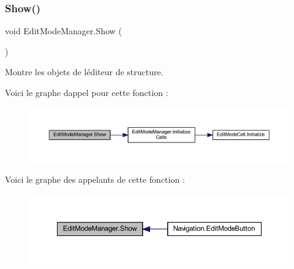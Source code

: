 \subsubsection{\texorpdfstring{Show()}{Show()}}
{\footnotesize\ttfamily void Edit\+Mode\+Manager.\+Show (\begin{DoxyParamCaption}{ }\end{DoxyParamCaption})\hspace{0.3cm}{\ttfamily [inline]}}



Montre les objets de l\textquotesingle{}éditeur de structure. 

Voici le graphe d\textquotesingle{}appel pour cette fonction \+:
\nopagebreak
\begin{figure}[H]
\begin{center}
\leavevmode
\includegraphics[width=350pt]{class_edit_mode_manager_acf80baac30f6611bcb1bf97b61ffc1ca_cgraph}
\end{center}
\end{figure}
Voici le graphe des appelants de cette fonction \+:
\nopagebreak
\begin{figure}[H]
\begin{center}
\leavevmode
\includegraphics[width=350pt]{class_edit_mode_manager_acf80baac30f6611bcb1bf97b61ffc1ca_icgraph}
\end{center}
\end{figure}
